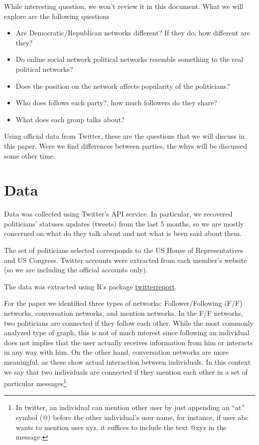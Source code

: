 \documentclass[12]{article}
\begin{document}
While interesting question, we won't review it in this document. What we will explore are the following questions

\begin{itemize}
	\item Are Democratic/Republican networks different? If they do, how different are they?
	\item Do online social network political networks resemble something to the real political networks?
	\item Does the position on the network affects popularity of the politicians?
	\item Who does follows each party?, how much followers do they share?
	\item What does each group talks about?
\end{itemize}

Using official data from Twitter, these are the questions that we will discuss in this paper. Were we find differences between parties, the whys will be discussed some other time.

\section{Data}

Data was collected using Twitter's API service. In particular, we recovered politicians' statuses updates (tweets) from the last 5 months, so we are mostly concerned on what do they talk about and not what is been said about them.

The set of politicians selected corresponds to the US House of Representatives and US Congress. Twitter accounts were extracted from each member's website (so we are including the official accounts only).

The data was extracted using R's package \href{http://github.com/gvegayon/twitterreport}{twitterreport}.

For the paper we identified three types of networks: Follower/Following (F/F) networks, conversation networks, and mention networks. In the F/F networks, two politicians are connected if they follow each other. While the most commonly analyzed type of graph, this is not of much interest since following an individual does not implies that the user actually receives information from him or interacts in any way with him. On the other hand, conversation networks are more meaningful, as these show actual interaction between individuals. In this context we say that two individuals are connected if they mention each other in a set of particular messages\footnote{In twitter, an individual can mention other user by just appending an ``at'' symbol (@) before the other individual's user name, for instance, if user abc wants to mention user xyz, it suffices to include the text @xyz in the message.}
\end{document}
